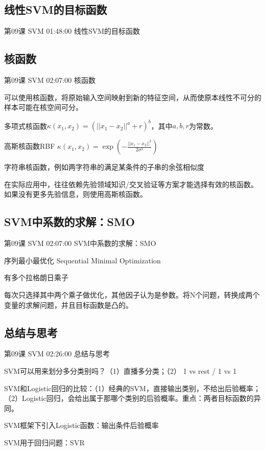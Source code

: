 \documentclass[UTF8]{ctexbook}
\begin{document}
\subsection{线性SVM的目标函数}

第09课 SVM 01:48:00 线性SVM的目标函数

\subsection{核函数}

第09课 SVM 02:07:00 核函数

可以使用核函数，将原始输入空间映射到新的特征空间，从而使原本线性不可分的样本可能在核空间可分。

多项式核函数$\kappa(x_{1},x_{2})=(||x_{1}-x_{2}||^{a}+r)^{b}$，其中$a,b,r$为常数。

高斯核函数RBF $\kappa(x_{1},x_{2})=\exp \left ( -\frac{||x_{1}-x_{2}||^{2}}{2 \sigma^{2}}\right )$

字符串核函数，例如两字符串的满足某条件的子串的余弦相似度

在实际应用中，往往依赖先验领域知识/交叉验证等方案才能选择有效的核函数。如果没有更多先验信息，则使用高斯核函数。

\subsection{SVM中系数的求解：SMO}

第09课 SVM 02:07:00 SVM中系数的求解：SMO

序列最小最优化 Sequential Minimal Optimization

有多个拉格朗日乘子

每次只选择其中两个乘子做优化，其他因子认为是参数。将N个问题，转换成两个变量的求解问题，并且目标函数是凸的。

\subsection{总结与思考}

第09课 SVM 02:26:00 总结与思考

SVM可以用来划分多分类别吗？（1）直播多分类；（2） 1 vs rest / 1 vs 1

SVM和Logistic回归的比较：（1）经典的SVM，直接输出类别，不给出后验概率；（2）Logistic回归，会给出属于那哪个类别的后验概率。重点：两者目标函数的异同。

SVM框架下引入Logistic函数：输出条件后验概率

SVM用于回归问题：SVR
\end{document}

